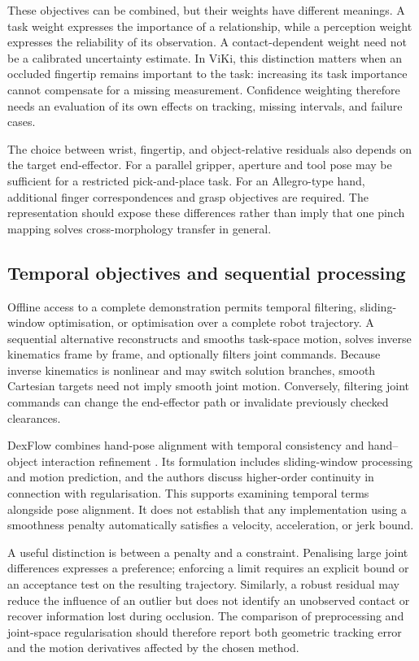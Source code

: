These objectives can be combined, but their weights have different meanings.
A task weight expresses the importance of a relationship, while a perception
weight expresses the reliability of its observation. A contact-dependent
weight need not be a calibrated uncertainty estimate. In ViKi, this distinction
matters when an occluded fingertip remains important to the task: increasing
its task importance cannot compensate for a missing measurement. Confidence
weighting therefore needs an evaluation of its own effects on tracking,
missing intervals, and failure cases.

The choice between wrist, fingertip, and object-relative residuals also depends
on the target end-effector. For a parallel gripper, aperture and tool pose may
be sufficient for a restricted pick-and-place task. For an Allegro-type hand,
additional finger correspondences and grasp objectives are required. The
representation should expose these differences rather than imply that one
pinch mapping solves cross-morphology transfer in general.

\subsection{Temporal objectives and sequential processing}

Offline access to a complete demonstration permits temporal filtering,
sliding-window optimisation, or optimisation over a complete robot trajectory.
A sequential alternative reconstructs and smooths task-space motion, solves
inverse kinematics frame by frame, and optionally filters joint commands.
Because inverse kinematics is nonlinear and may switch solution branches,
smooth Cartesian targets need not imply smooth joint motion. Conversely,
filtering joint commands can change the end-effector path or invalidate
previously checked clearances.

DexFlow combines hand-pose alignment with temporal consistency and
hand--object interaction refinement \cite{dexflow}. Its formulation includes
sliding-window processing and motion prediction, and the authors discuss
higher-order continuity in connection with regularisation. This supports
examining temporal terms alongside pose alignment. It does not establish that
any implementation using a smoothness penalty automatically satisfies a
velocity, acceleration, or jerk bound.

A useful distinction is between a penalty and a constraint. Penalising large
joint differences expresses a preference; enforcing a limit requires an
explicit bound or an acceptance test on the resulting trajectory. Similarly,
a robust residual may reduce the influence of an outlier but does not identify
an unobserved contact or recover information lost during occlusion. The
comparison of preprocessing and joint-space regularisation should therefore
report both geometric tracking error and the motion derivatives affected by
the chosen method.

